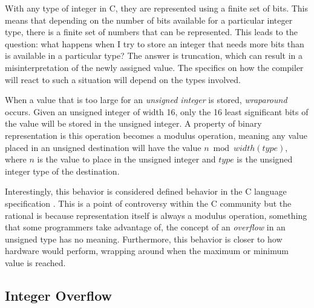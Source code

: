 With any type of integer in C, they are represented using a finite set of bits. This means that depending on the number of bits available for a particular integer type, there is a finite set of numbers that can be represented. This leads to the question: what happens when I try to store an integer that needs more bits than is available in a particular type? The answer is truncation, which can result in a misinterpretation of the newly assigned value. The specifics on how the compiler will react to such a situation will depend on the types involved.

When a value that is too large for an \textit{unsigned integer} is stored, \textit{wraparound} occurs. Given an unsigned integer of width 16, only the 16 least significant bits of the value will be stored in the unsigned integer. A property of binary representation is this operation becomes a modulus operation, meaning any value placed in an unsigned destination will have the value $n \bmod width(type)$, where $n$ is the value to place in the unsigned integer and $type$ is the unsigned integer type of the destination.

Interestingly, this behavior is considered defined behavior in the C language specification \cite{c_standard}. This is a point of controversy within the C community but the rational is because representation itself is always a modulus operation, something that some programmers take advantage of, the concept of an \textit{overflow} in an unsigned type has no meaning. Furthermore, this behavior is closer to how hardware would perform, wrapping around when the maximum or minimum value is reached.

\subsection{Integer Overflow}

